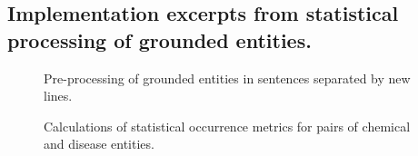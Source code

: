 \documentclass[10pt, oneside]{article}
\begin{document}

\small{}
\begin{appendices}
\section{Implementation excerpts from statistical processing of grounded entities.} \label{sec:implementations}
\begin{figure}[h]
\caption{\label{fig:preprocessing} Pre-processing of grounded entities in sentences separated by new lines.}
\end{figure}

\begin{figure}[h]
\caption{\label{fig:stats-calc} Calculations of statistical occurrence metrics for pairs of chemical and disease entities.}
\end{figure}

\end{appendices}
\end{document}
